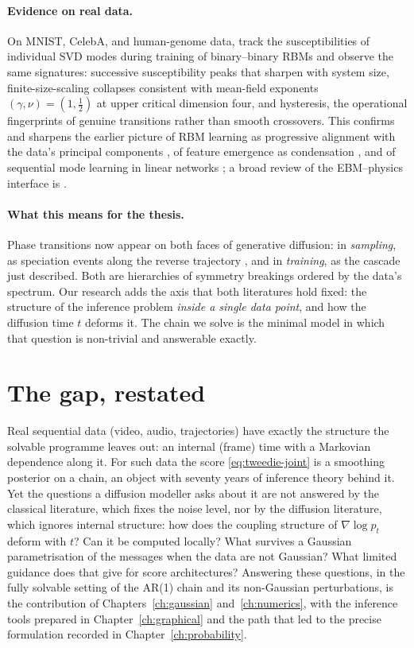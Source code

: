 \paragraph{Evidence on real data.} On MNIST, CelebA, and human-genome
data, \citet{bachtis2024cascade} track the susceptibilities of individual
SVD modes during training of binary--binary RBMs and observe the same
signatures: successive susceptibility peaks that sharpen with system
size, finite-size-scaling collapses consistent with mean-field exponents
$(\gamma, \nu) = (1, \tfrac12)$ at upper critical dimension four, and
hysteresis, the operational fingerprints of genuine transitions rather
than smooth crossovers. This confirms and sharpens the earlier picture of
RBM learning as progressive alignment with the data's principal
components \citep{decelle2017spectral}, of feature emergence as
condensation \citep{tubiana2017emergence}, and of sequential mode
learning in linear networks \citep{saxe2014exact}; a broad review of the
EBM--physics interface is \citet{carbone2025hitchhiker}.

\paragraph{What this means for the thesis.} Phase transitions now appear
on both faces of generative diffusion: in \emph{sampling}, as speciation
events along the reverse trajectory \citep{biroli2024dynamical,
achilli2026speciation}, and in \emph{training}, as the cascade just
described. Both are hierarchies of symmetry breakings ordered by the
data's spectrum. Our research adds the axis that both literatures hold
fixed: the structure of the inference problem \emph{inside a single data
point}, and how the diffusion time $t$ deforms it. The chain we solve is
the minimal model in which that question is non-trivial and answerable
exactly.

\section{The gap, restated}\label{sec:gap}\label{sec:related}

Real sequential data (video, audio, trajectories) have exactly the
structure the solvable programme leaves out: an internal (frame) time
with a Markovian dependence along it. For such data the score
\eqref{eq:tweedie-joint} is a smoothing posterior on a chain, an object
with seventy years of inference theory behind it. Yet the questions a
diffusion modeller asks about it are not answered by the classical
literature, which fixes the noise level, nor by the diffusion literature,
which ignores internal structure: how does the coupling structure of
$\nabla \log p_t$ deform with $t$? Can it be computed locally? What
survives a Gaussian parametrisation of the messages when the data are not
Gaussian? What limited guidance does that give for score architectures?
Answering these questions, in the fully solvable setting of the AR(1)
chain and its non-Gaussian perturbations, is the contribution of
Chapters~\ref{ch:gaussian} and~\ref{ch:numerics}, with the inference tools
prepared in Chapter~\ref{ch:graphical} and the path that led to the precise
formulation recorded in Chapter~\ref{ch:probability}.
